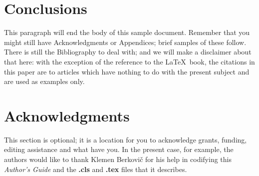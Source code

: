 \documentclass[article]{stucosrec}
\begin{document}
	\section{Conclusions}
	
	This paragraph will end the body of this sample document.
	Remember that you might still have Acknowledgments or
Appendices; brief samples of these
follow.
	There is still the Bibliography to deal with; and
we will make a disclaimer about that here: with the exception
of the reference to the \LaTeX\ book, the citations in
this paper are to articles which have nothing to
do with the present subject and are used as
examples only.
	
	\section{Acknowledgments}
	
	This section is optional; it is a location for you
to acknowledge grants, funding, editing assistance and
what have you.
	In the present case, for example, the
authors would like to thank Klemen Berkovič for
his help in codifying this \textit{Author's Guide}
and the \textbf{.cls} and \textbf{.tex} files that it describes.

	
	
\end{document}
